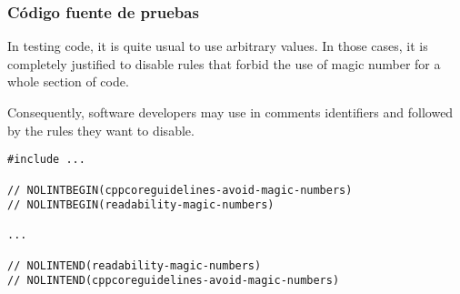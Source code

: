 \subsubsection{Código fuente de pruebas}

In testing code, it is quite usual to use arbitrary values. In those cases, it
is completely justified to disable rules that forbid the use of magic number for
a whole section of code.

Consequently, software developers may use in comments identifiers
 and  
followed by the rules they want to disable.

\begin{lstlisting}
#include ...

// NOLINTBEGIN(cppcoreguidelines-avoid-magic-numbers)
// NOLINTBEGIN(readability-magic-numbers)

...

// NOLINTEND(readability-magic-numbers)
// NOLINTEND(cppcoreguidelines-avoid-magic-numbers)
\end{lstlisting}
